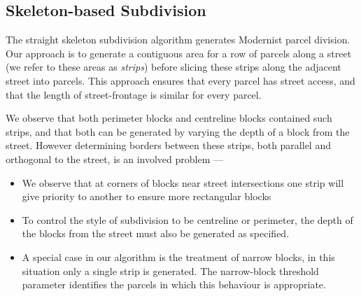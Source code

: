 



\subsection{Skeleton-based Subdivision}
\label{sec:skeletonSubivision}

The straight skeleton subdivision algorithm generates Modernist parcel division. Our approach is to generate a contiguous area for a row of parcels along a street (we refer to these areas as \emph{strips}) before slicing these strips along the adjacent street into parcels. This approach ensures that every parcel has street access, and that the length of street-frontage is similar for every parcel.

We observe that both perimeter blocks and centreline blocks contained such strips, and that both can be generated by varying the depth of a block from the street. However determining borders between these strips, both parallel and orthogonal to the street, is an involved problem ---
\begin{itemize}
\item We observe that at corners of blocks near street intersections one strip will give priority to another to ensure more rectangular blocks
\item To control the style of subdivision to be centreline or perimeter, the depth of the blocks from the street must also be generated as specified.
\item A special case in our algorithm is the treatment of narrow blocks, in this situation only a single strip is generated. The narrow-block threshold parameter identifies the parcels in which this behaviour is appropriate.
\end{itemize}

